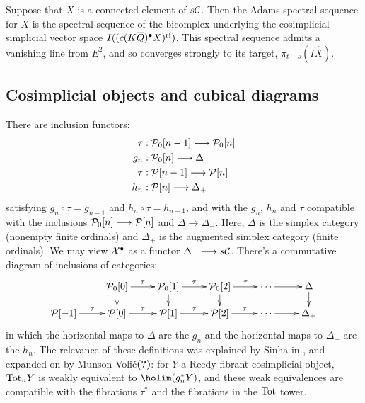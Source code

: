 \documentclass[10pt]{article}
\newcommand{\Comm}{\calC}
\begin{document}
\begin{TotalisationInSAlg}
\begin{cor}
\end{cor}
\begin{cor}
Suppose that $X$ is a connected element of $s\Comm$. Then the Adams spectral sequence for $X$ is the spectral sequence of the bicomplex underlying the cosimplicial simplicial vector space $I((c(K\overline{Q})^\bullet X)^{\textup{rf}})$. This spectral sequence admits a vanishing line from $E^2$, and so converges strongly to its target, $\pi_{t-s}(I\hat X)$.
\end{cor}
\end{TotalisationInSAlg}

\begin{convergence}

\subsection{Cosimplicial objects and cubical diagrams}

\begin{shaded}\tiny

There are inclusion functors:
\begin{alignat*}{2}
\tau
&:
\calP_0[n-1]\to \calP_0[n]%
\\
g_n
&:
\calP_0[n]\to \Delta
\\
\tau
&:
\calP[n-1]\to \calP[n]%
\\
h_n
&:
\calP[n]\to \Delta_+
\end{alignat*}
satisfying $g_n\circ \tau=g_{n-1}$ and $h_n\circ \tau=h_{n-1}$, and with the $g_n$, $h_n$ and $\tau$ compatible with the inclusions $\mathcal{P}_0[n]\longrightarrow \mathcal{P}[n]$ and $\Delta\to\Delta_+$. Here, $\Delta$ is the simplex category (nonempty finite ordinals) and $\Delta_+$ is the augmented simplex category (finite ordinals). We may view $\mathcal{X}^\bullet$ as a functor $\Delta_+\longrightarrow s\mathcal{C}$. There's a commutative diagram of inclusions of categories:
\[\xymatrix@R=4mm{
&%
\calP_0[0]\ar[r]^-{\tau}\ar[d]
&%
\calP_0[1]\ar[r]^-{\tau}\ar[d]
&%
\calP_0[2]\ar[r]^-{\tau}\ar[d]
&%
\cdots \ar[r]
&%
\Delta\ar[d]\\
\calP[-1]\ar[r]^-{\tau}
&%
\calP[0]\ar[r]^-{\tau}
&%
\calP[1]\ar[r]^-{\tau}
&%
\calP[2]\ar[r]^-{\tau}
&%
\cdots \ar[r]
&%
\Delta_+
}\]
in which the horizontal maps to $\Delta$ are the $g_n$ and the horizontal maps to $\Delta_+$ are the $h_n$. The relevance of these definitions was explained by Sinha in \cite[Theorem 6.5]{SinhaSpacesOfKnots.pdf}, and expanded on by Munson-Voli\'c\textbf{(?)}: for $Y$ a Reedy fibrant cosimplicial object, $\textup{Tot}_nY$ is weakly equivalent to $\holim(g_n^*Y)$, and these weak equivalences are compatible with the fibrations $\tau^*$ and the fibrations in the $\textup{Tot}$ tower.
\end{shaded}


\end{convergence}
\end{document}
